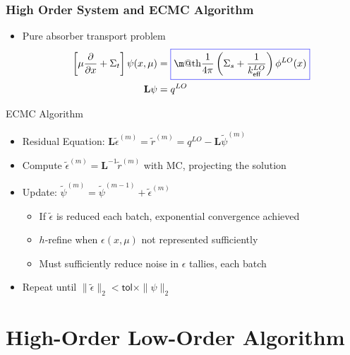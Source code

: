 \documentclass[xcolor=dvipsnames,handout,unknownkeysallowed]{beamer}
\makeatletter
\newcommand*{\boxedcolor}{blue}
\renewcommand{\boxed}[1]{\textcolor{\boxedcolor}{%
  \fbox{\normalcolor\m@th$\displaystyle#1$}}}
\newcommand{\keff}[0]{\ensuremath{{k}_{\textsf{eff}}} }
\newcommand{\colb}[1]{{\color{blue} #1}}
\newlength{\wideitemsep}
\let\olditem\item
\renewcommand{\item}{\setlength{\itemsep}{\wideitemsep}\olditem}
\newcommand{\pderiv}[2]{\frac{\partial #1}{\partial #2}}
\newcommand{\B}[1]{\ensuremath{\mathbf{#1}}}
\makeatother
\begin{document}
\begin{frame}
    \frametitle{High Order System and ECMC Algorithm}
    \begin{itemize}
        \item \colb{Pure absorber} transport problem
        \begin{align*}
            \left[\mu \pderiv{}{x} + \Sigma_t\right]\psi(x,\mu)
            &= \boxed{\frac{1}{4\pi}\left(\Sigma_s + \frac{1}{\keff^{LO}}\right)
        \phi^{LO}(x)} \\
         \B L \psi &= q^{LO}
     \end{align*}
        \vspace{-0.3in}
        \end{itemize}
        \begin{block}{ECMC Algorithm}
         \begin{itemize}
        \item Residual Equation: $\displaystyle \B L \tilde 
            \epsilon^{(m)} =
            \tilde r^{(m)} = q^{LO} - \B L \tilde\psi^{(m)}$
            \vspace{0.01in}
        \item Compute $\tilde{\epsilon}^{(m)} = \B L^{-1} \tilde{r}^{(m)}$ with MC,
            \colb{projecting} the solution  
        \item Update: $\tilde\psi^{(m)} = \tilde\psi^{(m-1)} + \tilde \epsilon^{(m)}$
        \begin{itemize}
            \item If $\tilde{\epsilon}$ is reduced each batch, \colb{exponential convergence
                achieved}
            \item $h$-refine when $\epsilon(x,\mu)$ not represented sufficiently
             \item Must sufficiently reduce noise in $\epsilon$ tallies, each batch
        \end{itemize}
    \item Repeat until $\| \tilde \epsilon \|_2 < \textsf{tol}\times \| \psi \|_2$
    \end{itemize}
\end{block}

\end{frame}

\section{High-Order Low-Order Algorithm}
\end{document}

